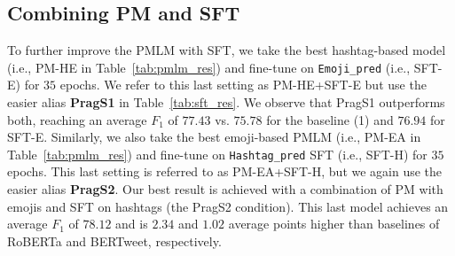 \subsection{Combining PM and SFT}\label{subsec:combine}
To further improve the PMLM with SFT, we take the best hashtag-based model (i.e., PM-HE in Table~\ref{tab:pmlm_res}) and fine-tune on \texttt{Emoji\_pred} (i.e., SFT-E) for $35$ epochs. We refer to this last setting as PM-HE+SFT-E but use the easier alias \textbf{PragS1} in Table~\ref{tab:sft_res}. We observe that PragS1 outperforms both, reaching an average $F_1$ of $77.43$ vs. $75.78$ for the baseline (1) and $76.94$ for SFT-E. Similarly, we also take the best emoji-based PMLM (i.e., PM-EA in Table~\ref{tab:pmlm_res}) and fine-tune on \texttt{Hashtag\_pred} SFT (i.e., SFT-H) for $35$ epochs. This last setting is referred to as PM-EA+SFT-H, but we again use the easier alias \textbf{PragS2}. Our best result is achieved with a combination of PM with emojis and SFT on hashtags (the PragS2 condition). This last model achieves an average $F_1$ of $78.12$ and is $2.34$ and $1.02$ average points higher than baselines of RoBERTa and BERTweet, respectively. 
 
